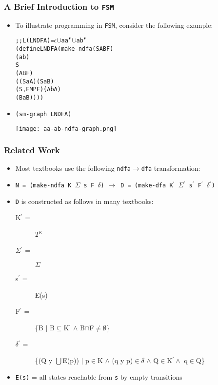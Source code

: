 \documentclass{beamer}
\newcommand{\fsm}{\texttt{FSM}}
\newcommand{\arrow}{\(\rightarrow\)}
\newcommand{\sig}{\texttt{\(\Sigma\)}}
\newcommand{\delt}{\texttt{\(\delta\)}}
\newcommand{\quot}{\texttt{\textquotesingle{}}}
\newcommand{\qquot}{\texttt{\textasciigrave{}}}
\newcommand{\dfa}{\texttt{dfa}}
\newcommand{\ndfa}{\texttt{ndfa}}
\begin{document}
\begin{frame}[fragile]
\frametitle{A Brief Introduction to \fsm}
\begin{scriptsize}
\begin{itemize}

\item<1-> To illustrate programming in \fsm{}, consider the following example:
\begin{alltt}
;; L(LNDFA) = {\(\epsilon\)} \(\cup\) aa\(\sp{\texttt{*}}\) \(\cup\) ab\(\sp{\texttt{*}}\)
(define LNDFA (make-ndfa \quot{}(S A B F)
                         \quot{}(a b)
                         \quot{}S
                         \quot{}(A B F)
                         \qquot{}((S a A) (S a B)
                           (S ,EMP F) (A b A)
                           (B a B))))
\end{alltt}

\item<2-> \texttt{(sm-graph LNDFA)}
\begin{center}
\texttt{[image: aa-ab-ndfa-graph.png]}
\end{center}

\end{itemize}
\end{scriptsize}
\end{frame}


\begin{frame}[fragile]
\frametitle{Related Work}
\begin{scriptsize}
\begin{itemize}
\item<1-> Most textbooks use the following \ndfa{}\arrow\dfa{} transformation:

\item<2-> \texttt{N = (make-ndfa K \sig{} s F \delt{})} \arrow \texttt{  D = (make-dfa K$^{\prime}$ \sig{}$^{\prime}$ s$^{\prime}$ F$^{\prime}$ \delt{}$^{\prime}$)}

\item<3-> \texttt{D} is constructed as follows in many textbooks:
\begin{description}
  \item [K$^{\prime}$ = ] 2$^K$
  \item[\sig{}$^{\prime}$ =] \sig{}
  \item[s$^{\prime}$ =] E(s)
  \item[F$^{\prime}$ =] \{B $|$ B$\subseteq$K$^{\prime}$ $\wedge$ B$\cap$F$\neq \emptyset$\}
  \item[\delt{}$^{\prime}$ =] \{(Q y $\bigcup$E(p)) $|$ p$\in$K $\wedge$ (q y p)$\in$\delt{} $\wedge$ Q$\in$K$^{\prime} \wedge$ q$\in$Q\} \newline
\end{description}

\item<3-> \texttt{E(s)} = all states reachable from \texttt{s} by empty transitions

\end{itemize}
\end{scriptsize}
\end{frame}
\end{document}
